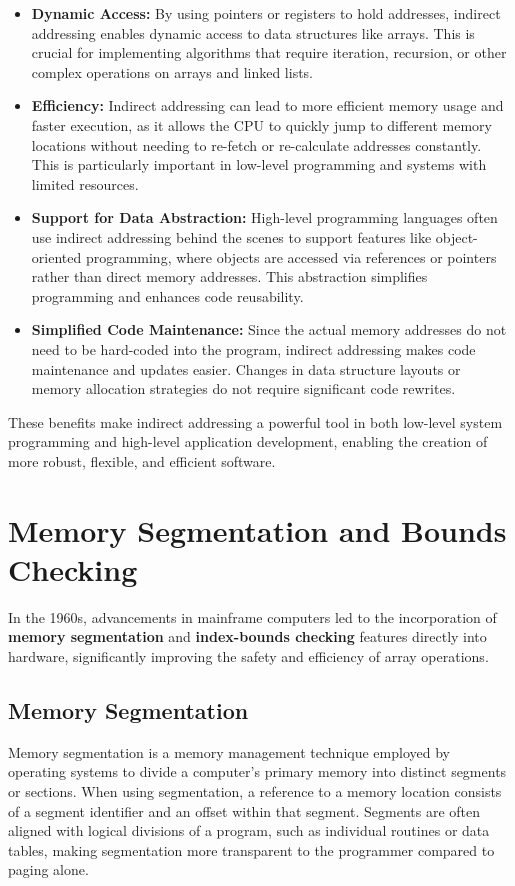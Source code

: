 \documentclass{book}
\begin{document}
\begin{itemize}
\begin{itemize}
\begin{itemize}
					\item \textbf{Dynamic Access:} By using pointers or registers to hold addresses, indirect addressing enables dynamic access to data structures like arrays. This is crucial for implementing algorithms that require iteration, recursion, or other complex operations on arrays and linked lists.
					
					\item \textbf{Efficiency:} Indirect addressing can lead to more efficient memory usage and faster execution, as it allows the CPU to quickly jump to different memory locations without needing to re-fetch or re-calculate addresses constantly. This is particularly important in low-level programming and systems with limited resources.
					
					\item \textbf{Support for Data Abstraction:} High-level programming languages often use indirect addressing behind the scenes to support features like object-oriented programming, where objects are accessed via references or pointers rather than direct memory addresses. This abstraction simplifies programming and enhances code reusability.
					
					\item \textbf{Simplified Code Maintenance:} Since the actual memory addresses do not need to be hard-coded into the program, indirect addressing makes code maintenance and updates easier. Changes in data structure layouts or memory allocation strategies do not require significant code rewrites.
					\end{itemize}
					These benefits make indirect addressing a powerful tool in both low-level system programming and high-level application development, enabling the creation of more robust, flexible, and efficient software.
			\end{itemize}
	 \end{itemize}

\section{Memory Segmentation and Bounds Checking}

In the 1960s, advancements in mainframe computers led to the incorporation of \textbf{memory segmentation} and \textbf{index-bounds checking} features directly into hardware, significantly improving the safety and efficiency of array operations.

\subsection{Memory Segmentation}
Memory segmentation is a memory management technique employed by operating systems to divide a computer's primary memory into distinct segments or sections. When using segmentation, a reference to a memory location consists of a segment identifier and an offset within that segment. Segments are often aligned with logical divisions of a program, such as individual routines or data tables, making segmentation more transparent to the programmer compared to paging alone. 
\end{document}

